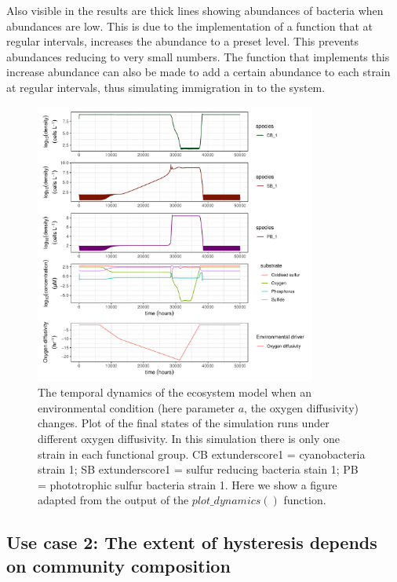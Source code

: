 \documentclass[]{elsarticle} %
\begin{document}
Also visible in the results are thick lines showing abundances of bacteria when abundances are low. This is due to the implementation of a function that at regular intervals, increases the abundance to a preset level. This prevents abundances reducing to very small numbers. The function that implements this increase abundance can also be made to add a certain abundance to each strain at regular intervals, thus simulating immigration in to the system.

\begin{figure}

{\centering \includegraphics[width=350px]{./figures/gen_uc1_partrep_temporal_state_switching} 

}

\caption{The temporal dynamics of the ecosystem model when an environmental condition (here parameter $a$, the oxygen diffusivity) changes. Plot of the final states of the simulation runs under different oxygen diffusivity. In this simulation there is only one strain in each functional group. CB    extunderscore1 = cyanobacteria strain 1; SB extunderscore1 = sulfur reducing bacteria stain 1; PB = phototrophic sulfur bacteria strain 1. Here we show a figure adapted from the output of the $plot\_dynamics()$  function.}\label{fig:uc1}
\end{figure}

\subsection{Use case 2: The extent of hysteresis depends on community composition}\label{use-case-2-the-extent-of-hysteresis-depends-on-community-composition}
\end{document}
